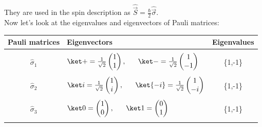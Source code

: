 \noindent They are used in the spin description as $\hat{\vec{S}}=\frac{\hbar}{2}\hat{\vec{\sigma}}$.\\
Now let's look at the eigenvalues and eigenvectors of Pauli matrices:
\begin{center}
    \begin{tabular}{clc}
        \hline
        \textbf{Pauli matrices} & \textbf{Eigenvectors} & \textbf{Eigenvalues} \\ \hline \\
        $\hat \sigma_1$ & $\ket + = \frac{1}{\sqrt 2}\begin{pmatrix} 1 \\ 1\end{pmatrix}, \ \ \ \ \ \ket- = \frac{1}{\sqrt 2}\begin{pmatrix} 1 \\ -1\end{pmatrix} $ & \{1,-1\}\\ \\
        $\hat \sigma_2$ & $\ket i = \frac{1}{\sqrt 2}\begin{pmatrix} 1 \\ i\end{pmatrix}, \ \ \ \ \ \ket{-i} = \frac{1}{\sqrt 2}\begin{pmatrix} 1 \\ -i\end{pmatrix} $ & \{1,-1\}\\ \\
        $\hat \sigma_3$ & $\ket 0 = \begin{pmatrix} 1 \\ 0\end{pmatrix}, \ \ \ \ \ \ket 1 = \begin{pmatrix} 0 \\ 1\end{pmatrix} $ & \{1,-1\} \\ \\ \hline
    \end{tabular}
\end{center}

